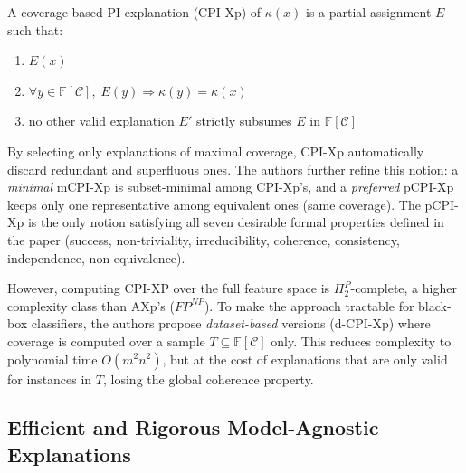 \begin{definition}[CPI-Xp]
    A coverage-based PI-explanation (CPI-Xp)
    of $\kappa(x)$ is a partial assignment $E$ such that: 
    \begin{enumerate}[label=(\roman*)]
        \item $E(x)$
        \item $\forall y \in \mathbb{F}[\mathcal{C}],\; E(y) \Rightarrow \kappa(y) = \kappa(x)$
        \item no other valid explanation $E'$ strictly subsumes $E$ in $\mathbb{F}[\mathcal{C}]$
    \end{enumerate}
\end{definition}

By selecting only explanations of maximal coverage, CPI-Xp automatically discard
redundant and superfluous ones. The authors further refine this notion: a
\emph{minimal} mCPI-Xp is subset-minimal among CPI-Xp's, and a
\emph{preferred} pCPI-Xp keeps only one representative among equivalent
ones (same coverage). The pCPI-Xp is the only notion satisfying all seven desirable
formal properties defined in the paper (success, non-triviality, irreducibility,
coherence, consistency, independence, non-equivalence).

However, computing CPI-XP over the full feature space is $\Pi_2^P$-complete, a
higher complexity class than AXp's ($FP^{NP}$). To make the approach tractable for
black-box classifiers, the authors propose \emph{dataset-based} versions
(d-CPI-Xp) where coverage is computed over a sample $T \subseteq \mathbb{F}[\mathcal{C}]$
only. This reduces complexity to polynomial time $O(m^2 n^2)$, but at the cost of
explanations that are only valid for instances in $T$, losing the global coherence
property.

\subsection{Efficient and Rigorous Model-Agnostic Explanations}

